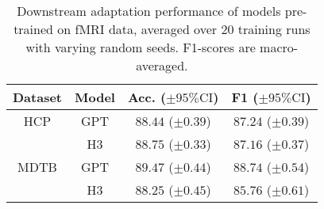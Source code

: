 \begin{table}[h]
    \small
    \centering
    \caption{\label{table:fmri-downstream} Downstream adaptation performance of models pre-trained on fMRI data, averaged over $20$ training runs with varying random seeds. F1-scores are macro-averaged.}
    {
        \begin{tabular}{@{}|c|c|cc|@{}}
        \hline
        Dataset & Model & Acc. ($\pm 95\% \text{CI}$) & F1 ($\pm 95\% \text{CI}$)\\ %
        \hline
        HCP & GPT & $88.44$ ($\pm 0.39$) & $87.24$ ($\pm 0.39$) \\
         & H3 & $88.75$ ($\pm 0.33$) & $87.16$ ($\pm 0.37$) \\ \hline
        MDTB & GPT & $89.47$ ($\pm 0.44$) & $88.74$ ($\pm 0.54$) \\
         & H3 & $88.25$ ($\pm 0.45$) & $85.76$ ($\pm 0.61$) \\ \hline
        \end{tabular}
    }
\end{table}